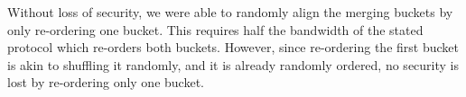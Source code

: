 \documentclass[12pt, oneside]{article}   	%
\begin{document}
Without loss of security, we were able to randomly align the merging buckets by only re-ordering one bucket. This requires half the bandwidth of the stated protocol which re-orders both buckets. However, since re-ordering the first bucket is akin to shuffling it randomly, and it is already randomly ordered, no security is lost by re-ordering only one bucket.



\end{document}
